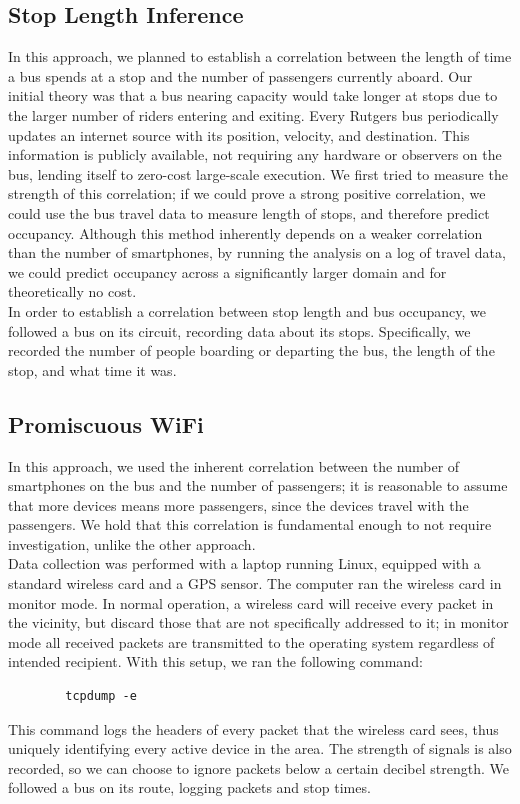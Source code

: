 \documentclass[11pt,journal,compsoc]{IEEEtran} %
\begin{document}
\subsection*{Stop Length Inference}

	In this approach, we planned to establish a correlation between the length of time a bus spends at a stop and the number of passengers currently aboard.
Our initial theory was that a bus nearing capacity would take longer at stops due to the larger number of riders entering and exiting.
	Every Rutgers bus periodically updates an internet source with its position, velocity, and destination.
	This information is publicly available, not requiring any hardware or observers on the bus, lending itself to zero-cost large-scale execution.
	We first tried to measure the strength of this correlation; if we could prove a strong positive correlation, we could use the bus travel data to measure length of stops, and therefore predict occupancy.
	Although this method inherently depends on a weaker correlation than the number of smartphones, by running the analysis on a log of travel data, we could predict occupancy across a significantly larger domain and for theoretically no cost.
	\\
	In order to establish a correlation between stop length and bus occupancy, we followed a bus on its circuit, recording data about its stops. Specifically, we recorded the number of people boarding or departing the bus, the length of the stop, and what time it was.

\subsection*{Promiscuous WiFi}

	In this approach, we used the inherent correlation between the number of smartphones on the bus and the number of passengers; it is reasonable to assume that more devices means more passengers, since the devices travel with the passengers.
	We hold that this correlation is fundamental enough to not require investigation, unlike the other approach.\\
    Data collection was performed with a laptop running Linux, equipped with a standard wireless card and a GPS sensor.
	The computer ran the wireless card in monitor mode.
	In normal operation, a wireless card will receive every packet in the vicinity, but discard those that are not specifically addressed to it; in monitor mode all received packets are transmitted to the operating system regardless of intended recipient. With this setup, we ran the following command:
	\begin{verbatim}
		tcpdump -e
	\end{verbatim}
	This command logs the headers of every packet that the wireless card sees, thus uniquely identifying every active device in the area.
	The strength of signals is also recorded, so we can choose to ignore packets below a certain decibel strength.
	We followed a bus on its route, logging packets and stop times.
    
\end{document}
